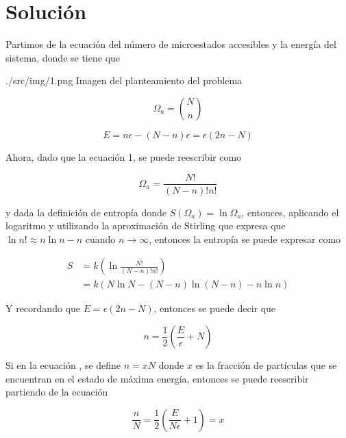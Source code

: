 \section{Solución}
Partimos de la ecuación del número de microestados accesibles y la energía del sistema, donde se tiene que

\imagen
{./src/img/1.png}
{Imagen del planteamiento del problema}
{\label{fig:1}}

\begin{equation}
    \Omega_a = \binom{N}{n}
\end{equation}

\begin{equation}
    E = n\epsilon - (N - n)\epsilon = \epsilon(2n-N)
\end{equation}

Ahora, dado que la ecuación 1, se puede reescribir como

\begin{equation}
    \Omega_a = \frac{N!}{(N-n)!n!}
\end{equation}

y dada la definición de entropía donde $S(\Omega_a) = \ln{\Omega_a}$, entonces, aplicando el logaritmo y utilizando la aproximación de Stirling que expresa que $\ln{n!} \approx n\ln{n} - n$ cuando $n\rightarrow\infty$, entonces la entropía se puede expresar como

\begin{equation}
    \begin{aligned}
    S &= k\left(\ln{\frac{N!}{(N-n)!n!}}\right) \\
    &= k\left(N\ln{N} - (N-n)\ln{(N-n)} - n\ln{n}\right)
    \end{aligned}
    \label{eq:entropia}
\end{equation}

Y recordando que $E = \epsilon(2n-N)$, entonces se puede decir que

\begin{equation}
    n = \frac{1}{2}\left(\frac{E}{\epsilon} + N\right)
    \label{eq:n}
\end{equation}

Si en la ecuación , se define $n = xN$ donde $x$ es la fracción de partículas que se encuentran en el estado de máxima energía, entonces se puede reescribir partiendo de la ecuación 

\begin{equation}
    \frac{n}{N} = \frac{1}{2}\left(\frac{E}{N\epsilon} + 1\right) = x
    \label{eq:fraccion:1}
\end{equation}

